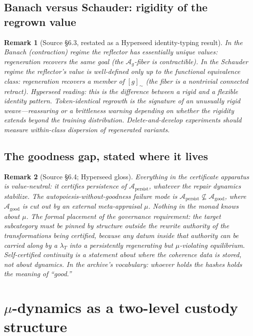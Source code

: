 \documentclass[11pt]{article}
\newtheorem{remark}{Remark}
\newcommand{\A}{\mathcal{A}}
\begin{document}
\subsection{Banach versus Schauder: rigidity of the regrown value}

\begin{remark}[Source \S6.3, restated as a Hyperseed identity-typing result]
In the Banach (contraction) regime the reflector has essentially unique values:
regeneration recovers \emph{the same goal} (the $\A_g$-fiber is contractible). In the
Schauder regime the reflector's value is well-defined only up to the functional
equivalence class: regeneration recovers \emph{a member of} $[g]_{\sim}$ (the fiber is a
nontrivial connected retract). Hyperseed reading: this is the difference between a
\emph{rigid} and a \emph{flexible} identity pattern. Token-identical regrowth is the
signature of an unusually rigid weave---reassuring or a brittleness warning depending on
whether the rigidity extends beyond the training distribution. Delete-and-develop
experiments should \emph{measure within-class dispersion} of regenerated variants.
\end{remark}

\subsection{The goodness gap, stated where it lives}

\begin{remark}[Source \S6.4; Hyperseed gloss]
Everything in the certificate apparatus is value-neutral: it certifies persistence of
$\A_{\mathrm{persist}}$, whatever the repair dynamics stabilize. The
autopoiesis-without-goodness failure mode is $\A_{\mathrm{persist}} \not\subseteq
\A_{\mathrm{good}}$, where $\A_{\mathrm{good}}$ is cut out by an external meta-appraisal
$\mu$. Nothing in the monad knows about $\mu$. The formal placement of the governance
requirement: the target subcategory must be pinned by structure \emph{outside the rewrite
authority} of the transformations being certified, because any datum inside that authority
can be carried along by a $\lambda_T$ into a persistently regenerating but $\mu$-violating
equilibrium. Self-certified continuity is a statement about \emph{where the coherence
data is stored}, not about dynamics. In the archive's vocabulary: whoever holds the
hashes holds the meaning of ``good.''
\end{remark}

\section{$\mu$-dynamics as a two-level custody structure}\label{sec:mu}
\end{document}

